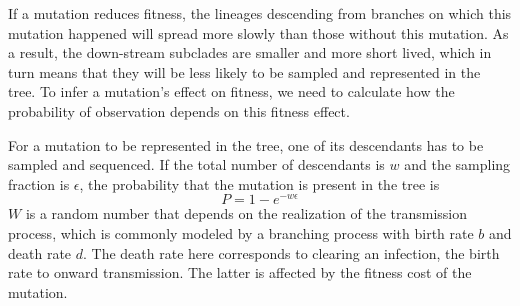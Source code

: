 \documentclass[9pt,twocolumn,twoside]{gsajnl_modified}
\begin{document}
If a mutation reduces fitness, the lineages descending from branches on which this mutation happened will spread more slowly than those without this mutation.
As a result, the down-stream subclades are smaller and more short lived, which in turn means that they will be less likely to be sampled and represented in the tree.
To infer a mutation's effect on fitness, we need to calculate how the probability of observation depends on this fitness effect.

For a mutation to be represented in the tree, one of its descendants has to be sampled and sequenced.
If the total number of descendants is $w$ and the sampling fraction is $\epsilon$, the probability that the mutation is present in the tree is
\begin{equation}
    P = 1 - e^{-w\epsilon}
\end{equation}
$W$ is a random number that depends on the realization of the transmission process, which is commonly modeled by a branching process with birth rate $b$ and death rate $d$.
The death rate here corresponds to clearing an infection, the birth rate to onward transmission. The latter is affected by the fitness cost of the mutation.
\end{document}
